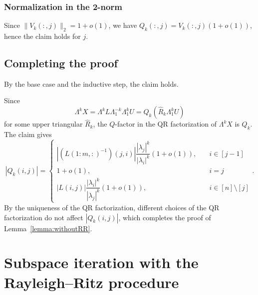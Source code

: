 \documentclass[11pt,a4paper]{article}
\theoremstyle{plain}              %
\theoremstyle{definition}         %
\begin{document}
\subsubsection{Normalization in the 2-norm}

Since \(\|V_k(:,j)\|_2=1+o(1)\), we have \(Q_k(:,j)=V_k(:,j)(1+o(1))\), hence the claim holds for \(j\).

\subsection{Completing the proof}

By the base case and the inductive step, the claim holds.

Since
\[
\Lambda^kX=\Lambda^kL\Lambda_1^{-k}\Lambda_1^kU=Q_k(\hat{R}_k\Lambda_1^kU)
\]
for some upper triangular \(\hat{R}_k\), the \(Q\)-factor in the QR factorization of \(\Lambda^kX\) is \(Q_k\). The claim gives
\[
|Q_k(i,j)|=\begin{cases}
|(L(1:m,:)^{-1})(j,i)|\dfrac{|\lambda_j|^k}{|\lambda_i|^k}(1+o(1)),\quad&i\in[j-1]\\
1+o(1),\quad&i=j\\
|L(i,j)|\dfrac{|\lambda_i|^k}{|\lambda_j|^k}(1+o(1)),\quad&i\in[n]\setminus[j]
\end{cases}.
\]
By the uniqueness of the QR factorization, different choices of the QR factorization do not affect \(|Q_k(i,j)|\), which completes the proof of Lemma~\ref{lemma:withoutRR}.

\section{Subspace iteration with the Rayleigh--Ritz procedure}\label{section:withRR}
\end{document}
